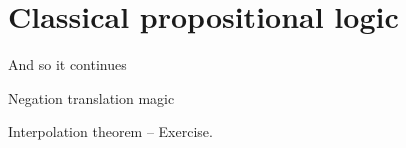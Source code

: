 %
\chapter{Classical propositional logic}
%
And so it continues

\bigskip
Negation translation magic

Interpolation theorem -- Exercise.